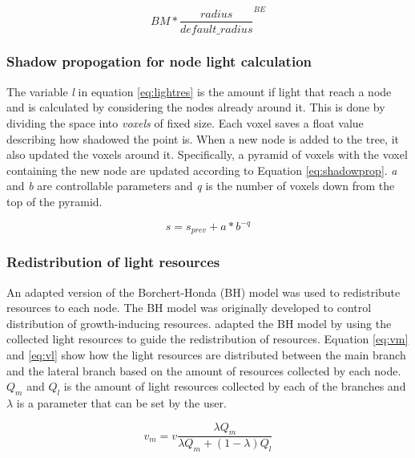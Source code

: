 \documentclass{article}
\begin{document}
  				\begin{equation}
  					\label{eq:nodecost}
  					BM * {\frac{radius}{default\_radius}}^{BE}
  				\end{equation}
  				
  			\subsubsection*{Shadow propogation for node light calculation}
  				
  				The variable \textit{l} in equation \ref{eq:lightres} is the amount if light that reach a node and is calculated by considering the nodes already around it. This is done by dividing the space into \textit{voxels} of fixed size. Each voxel saves a float value describing how shadowed the point is. When a new node is added to the tree, it also updated the voxels around it. Specifically, a pyramid of voxels with the voxel containing the new node are updated according to Equation \ref{eq:shadowprop}. \textit{a} and \textit{b} are controllable parameters and \textit{q} is the number of voxels down from the top of the pyramid. \citep{palubicki2009self}
  				
  				\begin{equation}
  					\label{eq:shadowprop}
  					s = s_{prev} + a*b^{-q}
  				\end{equation}
  			
  			\subsubsection*{Redistribution of light resources}
  				An adapted version of the Borchert-Honda (BH) model \citep{borchert1984control} was used to redistribute resources to each node. The BH model was originally developed to control distribution of growth-inducing resources. \cite{palubicki2009self} adapted the BH model by using the collected light resources to guide the redistribution of resources. Equation \ref{eq:vm} and \ref{eq:vl} show how the light resources are distributed between the main branch and the lateral branch  based on the amount of resources collected by each node. $Q_m$ and $Q_l$ is the amount of light resources collected by each of the branches and $\lambda$ is a parameter that can be set by the user.
  			
	  			\begin{equation}
	  				\label{eq:vm}
	  				v_m = v\frac{\lambda Q_m}{\lambda Q_m + (1 - \lambda)Q_l}
	  			\end{equation}
	  			
\end{document}
